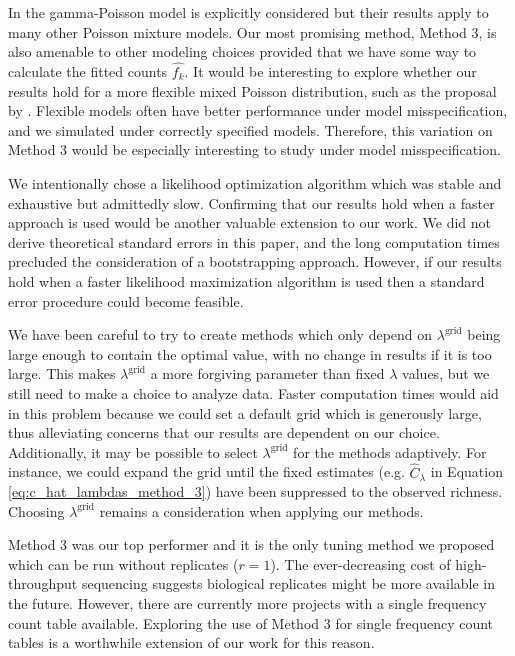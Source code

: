 \documentclass[oupdraft]{bio}
\newcommand{\lambdagrid}{\lambda^{\text{grid}}}
\begin{document}
In \citet{wang_2005} the gamma-Poisson model is explicitly considered but their results apply to many other Poisson mixture models.  Our most promising method, Method 3, is also amenable to other modeling choices provided that we have some way to calculate the fitted counts $\widehat{f_k}$.  It would be interesting to explore whether our results hold for a more flexible mixed Poisson distribution, such as the proposal by \citet{norris_1998}.  Flexible models often have better performance under model misspecification, and we simulated under correctly specified models.  Therefore, this variation on  Method 3 would be especially interesting to study under model misspecification.

We intentionally chose a likelihood optimization algorithm which was stable and exhaustive but admittedly slow.  Confirming that our results hold when a faster approach is used would be another valuable extension to our work. We did not derive theoretical standard errors in this paper, and the long computation times precluded the consideration of a bootstrapping approach.  However, if our results hold when a faster likelihood maximization algorithm is used then a standard error procedure could become feasible.

We have been careful to try to create methods which only depend on $\lambdagrid$ being large enough to contain the optimal value, with no change in results if it is too large.  This makes $\lambdagrid$ a more forgiving parameter than fixed $\lambda$ values, but we still need to make a choice to analyze data.  Faster computation times would aid in this problem because we could set a default grid which is generously large, thus alleviating concerns that our results are dependent on our choice.  Additionally, it may be possible to select $\lambdagrid$ for the methods adaptively.  For instance, we could expand the grid until the fixed estimates (e.g. $\widehat{C}_{\lambda}$ in Equation \ref{eq:c_hat_lambdas_method_3}) have been suppressed to the observed richness.  Choosing $\lambdagrid$ remains a consideration when applying our methods.

Method 3 was our top performer and it is the only tuning method we proposed which can be run without replicates ($r = 1$).  The ever-decreasing cost of high-throughput sequencing suggests biological replicates might be more available in the future.  However, there are currently more projects with a single frequency count table available.  Exploring the use of Method 3 for single frequency count tables is a worthwhile extension of our work for this reason.
\end{document}
